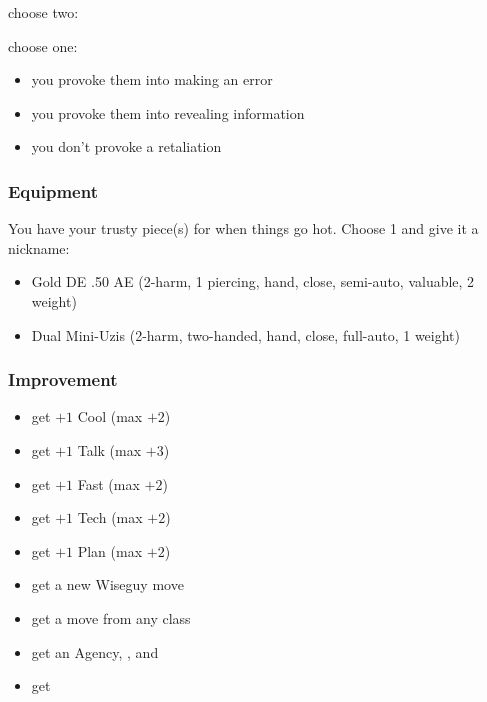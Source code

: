 {choose two:}
{choose one:
\begin{itemize}
\item you provoke them into making an error
\item you provoke them into revealing information
\item you don't provoke a retaliation
\end{itemize}}



\subsubsection{Equipment}
You have your trusty piece(s) for when things go hot. Choose 1 and give it a nickname:
\begin{itemize}
\item Gold DE .50 AE (2-harm, 1 piercing, hand, close, semi-auto, valuable, 2 weight)
\item Dual Mini-Uzis (2-harm, two-handed, hand, close, full-auto, 1 weight) 
\end{itemize}

\subsubsection{Improvement}
\begin{itemize}
\item get $+1$ Cool (max $+2$)
\item get $+1$ Talk (max $+3$)
\item get $+1$ Fast (max $+2$)
\item get $+1$ Tech (max $+2$)
\item get $+1$ Plan (max $+2$)
\item get a new Wiseguy move
\item get a move from any class
\item get an Agency, , and 
\item get 
\end{itemize}



